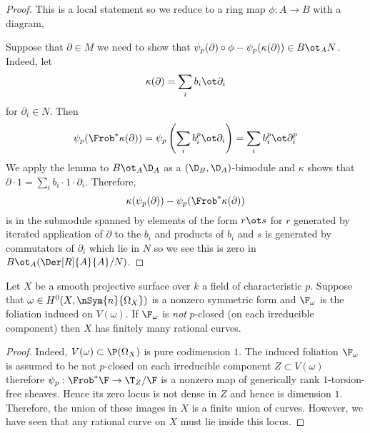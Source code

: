 \documentclass[12pt]{article}
\begin{document}
\begin{proof}
This is a local statement so we reduce to a ring map $\phi : A \to B$ with a diagram,
\begin{center}
\end{center}
Suppose that $\partial \in M$ we need to show that $\psi_p(\partial) \circ \phi - \psi_p(\kappa(\partial)) \in B \ot_A N$. Indeed, let
\[ \kappa(\partial) = \sum_i b_i \ot \partial_i \]
for $\partial_i \in N$. Then 
\[ \psi_p(\Frob^* \kappa(\partial)) = \psi_p \left(\sum_i b_i^p \ot \partial_i \right) = \sum_i b_i^p \ot \partial_i^p \]
We apply the lemma to $B \ot_A \D_A$ as a $(\D_B, \D_A)$-bimodule and $\kappa$ shows that $\partial \cdot 1 = \sum_i b_i \cdot 1 \cdot \partial_i$. Therefore,
\[ \kappa(\psi_p(\partial)) - \psi_p(\Frob^* \kappa(\partial)) \]
is in the submodule spanned by elements of the form $r \ot s$ for $r$ generated by iterated application of $\partial$ to the $b_i$ and products of $b_i$ and $s$ is generated by commutators of $\partial_i$ which lie in $N$ so we see this is zero in $B \ot_A (\Der[R]{A}{A} / N)$.
\end{proof}


\begin{theorem}
Let $X$ be a smooth projective surface over $k$ a field of characteristic $p$. Suppose that $\omega \in H^0(X, \nSym{n}{\Omega_X})$ is a nonzero symmetric form and $\F_{\omega}$ is the foliation induced on $V(\omega)$. If $\F_{\omega}$ is \textit{not} $p$-closed (on each irreducible component) then $X$ has finitely many rational curves.
\end{theorem}

\begin{proof}
Indeed, $V(\omega) \subset \P(\Omega_X)$ is pure codimension $1$. The induced foliation $\F_\omega$ is assumed to be not $p$-closed on each irreducible component $Z \subset V(\omega)$ therefore $\psi_p : \Frob^* \F \to \T_Z/\F$ is a nonzero map of generically rank $1$-torsion-free sheaves. Hence its zero locus is not dense in $Z$ and hence is dimension $1$. Therefore, the union of these images in $X$ is a finite union of curves. However, we have seen that any rational curve on $X$ must lie inside this locus.
\end{proof}
\end{document}
